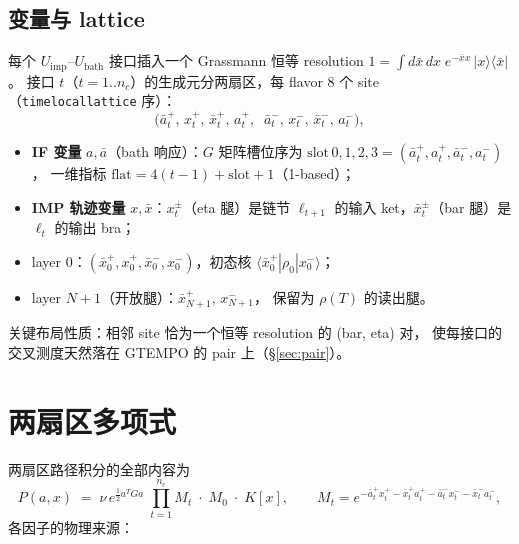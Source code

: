 \documentclass[11pt,a4paper]{ctexart}
\newcommand{\ab}{\bar a}          %
\newcommand{\xb}{\bar x}          %
\begin{document}
\subsection{变量与 lattice}

每个 $U_{\mathrm{imp}}$--$U_{\mathrm{bath}}$ 接口插入一个 Grassmann
恒等 resolution $1=\int d\bar x\,dx\;e^{-\bar xx}\,|x\rangle\langle\bar x|$。
接口 $t$（$t=1..n_c$）的生成元分两扇区，每 flavor $8$ 个 site
（\texttt{timelocallattice} 序）：
\begin{equation}
\big(\ab_t^{+},\,x_t^{+},\,\xb_t^{+},\,a_t^{+},\;\;
     \ab_t^{-},\,x_t^{-},\,\xb_t^{-},\,a_t^{-}\big),
\label{eq:layout}
\end{equation}
\begin{itemize}
\item \textbf{IF 变量} $a,\ab$（bath 响应）：$G$ 矩阵槽位序为
  $\mathrm{slot}\,0,1,2,3=(\ab_t^{+},a_t^{+},\ab_t^{-},a_t^{-})$，
  一维指标 $\mathrm{flat}=4(t{-}1)+\mathrm{slot}+1$（1-based）；
\item \textbf{IMP 轨迹变量} $x,\xb$：$x_t^{\pm}$（eta 腿）是链节
  $\ell_{t+1}$ 的输入 ket，$\xb_t^{\pm}$（bar 腿）是 $\ell_t$ 的输出 bra；
\item layer $0$：$(\xb_0^{+},x_0^{+},\xb_0^{-},x_0^{-})$，初态核
  $\langle\xb_0^{+}|\rho_0|x_0^{-}\rangle$；
\item layer $N{+}1$（开放腿）：$\xb_{N+1}^{+},\,x_{N+1}^{-}$，
  保留为 $\rho(T)$ 的读出腿。
\end{itemize}
关键布局性质：相邻 site 恰为一个恒等 resolution 的 (bar, eta) 对，
使每接口的交叉测度天然落在 GTEMPO 的 pair 上（\S\ref{sec:pair}）。

\section{两扇区多项式}

两扇区路径积分的全部内容为
\begin{equation}
P(a,x)\;=\;\nu\,e^{\frac12 a^{T}Ga}\;
   \prod_{t=1}^{n_c} M_t\;\cdot\;M_0\;\cdot\;K[x],
\qquad
M_t = e^{-\ab_t^{+}x_t^{+}-\xb_t^{+}a_t^{+}
                  -\ab_t^{-}x_t^{-}-\xb_t^{-}a_t^{-}},
\label{eq:twosector}
\end{equation}
各因子的物理来源：
\end{document}

